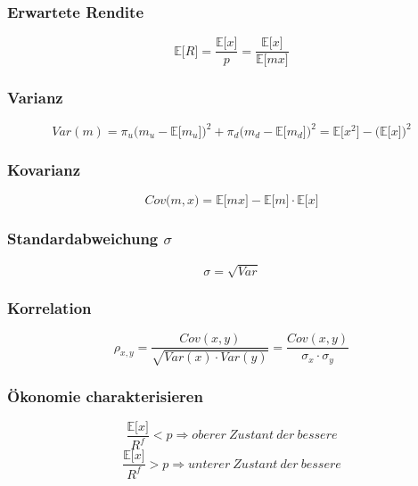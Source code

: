 \subsubsection{Erwartete Rendite}
\begin{equation}
	\mathbb{E} \big\lbrack R \big\rbrack = \frac{\mathbb{E} \big\lbrack x \big\rbrack}{p} = \frac{\mathbb{E} \big\lbrack x \big\rbrack}{\mathbb{E} \big\lbrack mx \big\rbrack}
\end{equation}

\subsubsection{Varianz}
\begin{equation}
	Var(m) = \pi_u \Big(m_u - \mathbb{E} \big\lbrack m_u \big\rbrack\Big)^2 + \pi_d \Big(m_d - \mathbb{E} \big\lbrack m_d \big\rbrack\Big)^2 = \mathbb{E} \big\lbrack x^2 \big\rbrack - \Big( \mathbb{E} \big\lbrack x \big\rbrack \Big)^2
\end{equation}

\subsubsection{Kovarianz}
\begin{equation}
	Cov\big(m,x\big) = \mathbb{E} \big\lbrack m x \big\rbrack - \mathbb{E} \big\lbrack m \big\rbrack \cdot \mathbb{E} \big\lbrack x \big\rbrack
\end{equation}

\subsubsection{Standardabweichung \(\sigma\)}
\begin{equation}
	\sigma = \sqrt{Var}
\end{equation}

\subsubsection{Korrelation}
\begin{equation}
	\rho_{x,y} = \frac{Cov(x,y)}{\sqrt{Var(x) \cdot Var(y)}} = \frac{Cov(x,y)}{\sigma_x \cdot \sigma_y}
\end{equation}

\subsubsection{Ökonomie charakterisieren}
\begin{equation}
	\frac{\mathbb{E} \big\lbrack x \big\rbrack}{R^f} < p \Rightarrow oberer~Zustant~der~bessere
\end{equation}
\begin{equation}
	\frac{\mathbb{E} \big\lbrack x \big\rbrack}{R^f} > p \Rightarrow unterer~Zustant~der~bessere
\end{equation}


